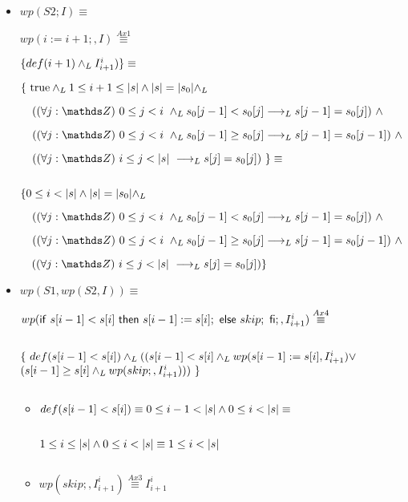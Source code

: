 \documentclass{article}
\begin{document}
\begin{itemize}
    \item $wp(S2; I) \equiv$

    $wp(i := i + 1;, I) \stackrel{Ax1}{\equiv}$

    $\{def(i + 1) \yLuego I_{i+1}^{i})\} \equiv$

    $ \{\ \True \yLuego 1 \leq i+1 \leq \longitud{s} \wedge \longitud{s} = \longitud{s_0} \yLuego$

    $\quad (\paraTodo{j}{0}{i} \yLuego s_0[j-1] < s_0[j] \implicaLuego s[j-1] = s_0[j])\ \wedge $

    $\quad (\paraTodo{j}{0}{i} \yLuego s_0[j-1] \geq s_0[j] \implicaLuego s[j-1] = s_0[j-1])\ \wedge$

    $\quad (\paraTodo{j}{i}{\longitud{s}} \implicaLuego s[j] = s_0[j])\ \} \equiv $

    $ $

    $ \{0 \leq i < \longitud{s} \wedge \longitud{s} = \longitud{s_0} \yLuego$

    $\quad (\paraTodo{j}{0}{i} \yLuego s_0[j-1] < s_0[j] \implicaLuego s[j-1] = s_0[j])\ \wedge $

    $\quad (\paraTodo{j}{0}{i} \yLuego s_0[j-1] \geq s_0[j] \implicaLuego s[j-1] = s_0[j-1])\ \wedge$

    $\quad (\paraTodo{j}{i}{\longitud{s}} \implicaLuego s[j] = s_0[j])\} $

    \item $wp(S1, wp(S2, I)) \equiv$

    $ wp(\IfThenElse{s[i-1] < s[i]}{s[i-1]:= s[i];}{skip;};, I_{i+1}^{i}) \stackrel{Ax4}{\equiv}$

    $ $

    $ \{\ def(s[i-1] < s[i]) \yLuego ((s[i-1] < s[i] \yLuego wp(s[i-1]:=s[i], I_{i+1}^{i}) \vee $
    $ ( s[i-1] \geq s[i] \yLuego wp(skip;, I_{i+1}^{i})))\ \} $

    $ $

    \begin{itemize}
        \item $def(s[i-1] < s[i]) \equiv 0 \leq i-1 < \longitud{s} \wedge 0 \leq i < \longitud{s} \equiv $

        $ $

        $1 \leq i \leq \longitud{s} \wedge 0 \leq i < \longitud{s} \equiv 1 \leq i < \longitud{s} $

        $ $

        \item $wp(skip;, I_{i+1}^{i}) \stackrel{Ax3}{\equiv} I_{i+1}^{i} $


\end{itemize}
\end{itemize}
\end{document}
